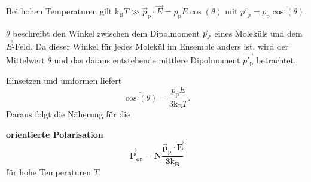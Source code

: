     Bei hohen Temperaturen gilt $\mathrm{k}_{\mathrm{B}}T\gg \vec{p}_{\text{p}}\cdot\vec{E} = p_\text{p} E \cos\left( \theta \right) $ mit $p'_{\text{p}}= p_\mathrm{p} \overline{\cos\left( \theta \right) }$.
    \begin{verbal}
        $\theta$ beschreibt den Winkel zwischen dem Dipolmoment $\vec p_\text p$ eines Moleküls und dem $\vec E$-Feld. Da dieser Winkel für jedes Molekül im Ensemble anders ist, wird der Mittelwert $\overline\theta$ und das daraus entstehende mittlere Dipolmoment $\vec{p'_\mathrm p}$ betrachtet.
    \end{verbal}
    Einsetzen und umformen liefert 
    $$
        \overline{\cos\left( \theta \right) }= \frac{p_{\mathrm p} E}{ 3 \mathrm{k}_{\mathrm{B}}T}.
    $$ 
    Daraus folgt die Näherung für die 
    \begin{important}
        \textbf{orientierte Polarisation}\\
        \begin{equation}
        	\bm{\vec{P}_{\textbf{or}}= N \frac{\vec p_\mathrm p\cdot\vec{E}}{3 \mathrm{k}_{\textbf{B}}}}
        	\label{eq:2.16}
        \end{equation}
        für hohe Temperaturen $T$.
    \end{important}
    
